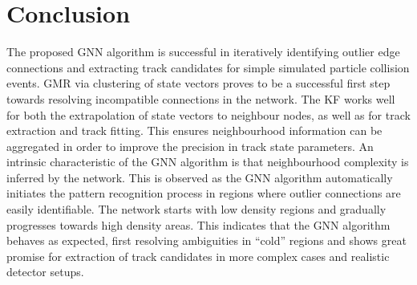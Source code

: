 \section{Conclusion}

The proposed GNN algorithm is successful in iteratively identifying outlier edge connections and extracting track candidates for simple simulated particle collision events. GMR via clustering of state vectors proves to be a successful first step towards resolving incompatible connections in the network. The KF works well for both the extrapolation of state vectors to neighbour nodes, as well as for track extraction and track fitting. This ensures neighbourhood information can be aggregated in order to improve the precision in track state parameters. An intrinsic characteristic of the GNN algorithm is that neighbourhood complexity is inferred by the network. This is observed as the GNN algorithm automatically initiates the pattern recognition process in regions where outlier connections are easily identifiable. The network starts with low density regions and gradually progresses towards high density areas. This indicates that the GNN algorithm behaves as expected, first resolving ambiguities in ``cold'' regions and shows great promise for extraction of track candidates in more complex cases and realistic detector setups.


